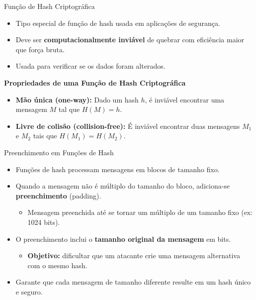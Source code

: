 \begin{frame}{Função de Hash Criptográfica}
    \begin{itemize}
        \item Tipo especial de função de hash usada em aplicações de segurança.
        \item Deve ser \textbf{computacionalmente inviável} de quebrar com eficiência maior que força bruta.
        \item Usada para verificar se os dados foram alterados.
    \end{itemize}
\textbf{Propriedades de uma Função de Hash Criptográfica}
    \begin{itemize}
        \item \textbf{Mão única (one-way):}  
        Dado um hash $h$, é inviável encontrar uma mensagem $M$ tal que $H(M) = h$.
        \item \textbf{Livre de colisão (collision-free):}  
        É inviável encontrar duas mensagens $M_1$ e $M_2$ tais que $H(M_1) = H(M_2)$.
    \end{itemize}
\end{frame}

\begin{frame}{Preenchimento em Funções de Hash}
    \begin{itemize}
        \item Funções de hash processam mensagens em blocos de tamanho fixo.
        \item Quando a mensagem não é múltiplo do tamanho do bloco, adiciona-se \textbf{preenchimento} (padding).
        
        \begin{itemize}
            \item Mensagem preenchida até se tornar um múltiplo de um tamanho fixo (ex: 1024 bits). 
        \end{itemize}
     
        \item O preenchimento inclui o \textbf{tamanho original da mensagem} em bits.
        \begin{itemize}
          \item \textbf{Objetivo:} dificultar que um atacante crie uma mensagem alternativa com o mesmo hash.
        \end{itemize}

        \item Garante que cada mensagem de tamanho diferente resulte em um hash único e seguro.
    \end{itemize}


\end{frame}

